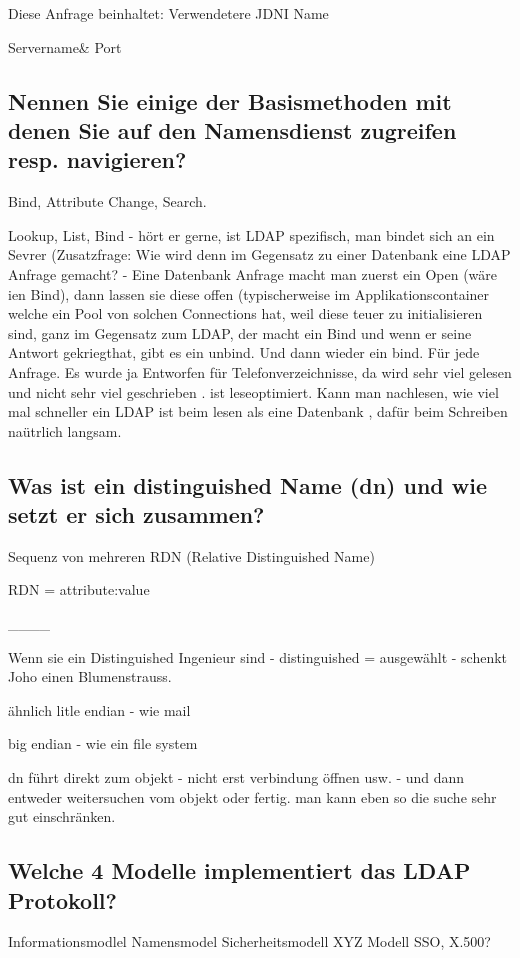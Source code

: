 Diese Anfrage beinhaltet:
Verwendetere JDNI Name 

Servername\& Port

\subsection{Nennen Sie einige der Basismethoden mit denen Sie auf den Namensdienst zugreifen resp. navigieren?}

Bind, Attribute Change, Search.

Lookup, List, Bind - hört er gerne, ist LDAP spezifisch, man bindet sich an ein Sevrer (Zusatzfrage: Wie wird denn im Gegensatz zu einer Datenbank eine LDAP Anfrage gemacht? - Eine Datenbank Anfrage macht man zuerst ein Open (wäre ien Bind), dann lassen sie diese offen (typischerweise im Applikationscontainer welche ein Pool von solchen Connections hat, weil diese teuer zu initialisieren sind, ganz im Gegensatz zum LDAP, der macht ein Bind und wenn er seine Antwort gekriegthat, gibt es ein unbind. Und dann wieder ein bind. Für jede Anfrage. Es wurde ja Entworfen für Telefonverzeichnisse, da wird sehr viel gelesen und nicht sehr viel geschrieben . ist leseoptimiert. Kann man nachlesen, wie viel mal schneller ein LDAP ist beim lesen als eine Datenbank , dafür beim Schreiben naütrlich langsam.

\subsection{Was ist ein distinguished Name (dn) und wie setzt er sich zusammen?}
Sequenz von mehreren RDN (Relative Distinguished Name)

RDN = attribute:value


____



Wenn sie ein Distinguished Ingenieur sind - distinguished = ausgewählt - schenkt Joho einen Blumenstrauss. 

ähnlich litle endian - wie mail

big endian - wie ein file system

dn führt direkt zum objekt - nicht erst verbindung öffnen usw. - und dann entweder weitersuchen vom objekt oder fertig. man kann eben so die suche sehr gut einschränken.

\subsection{Welche 4 Modelle implementiert das LDAP Protokoll?}
Informationsmodlel
Namensmodel
Sicherheitsmodell
XYZ Modell
SSO, X.500?

